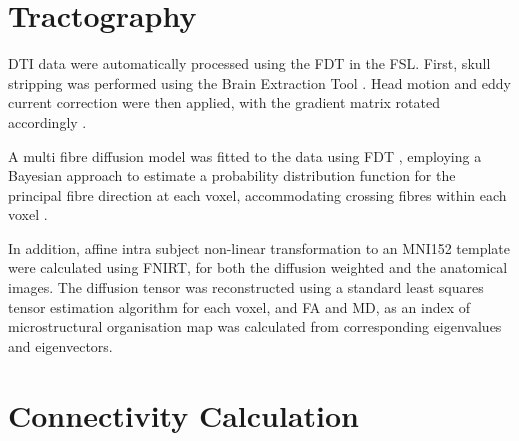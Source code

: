 \section{Tractography}

\ac{DTI} data were automatically processed using the \ac{FDT} in the \ac{FSL}. First, skull stripping was performed using the Brain Extraction Tool \cite{bet}. Head motion and eddy current correction were then applied, with the gradient matrix rotated accordingly \cite{eddy}.\par
A multi fibre diffusion model was fitted to the data using \ac{FDT} \cite{tract}, employing a Bayesian approach to estimate a probability distribution function for the principal fibre direction at each voxel, accommodating crossing fibres within each voxel \cite{tract2}.\par
In addition, affine intra subject non-linear transformation to an MNI152 template were calculated using \ac{FNIRT}, for both the diffusion weighted and the anatomical images. The diffusion tensor was reconstructed using a standard least squares tensor estimation algorithm for each voxel, and \ac{FA} and \ac{MD}, as an index of microstructural organisation map was calculated from corresponding eigenvalues and eigenvectors.

\section{Connectivity Calculation}

